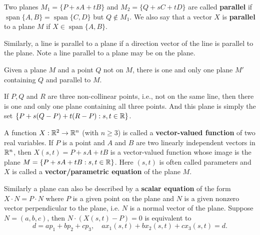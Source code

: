     \begin{definitionenv}
        Two planes $M_1 = \{ P + sA + tB\}$ and $M_2 = \{ Q + sC + tD\}$ are called \textbf{parallel} if $\operatorname{span} \{A,B\} = \operatorname{span} \{C,D\}$ but $Q\notin M_1$. We also say that a vector $X$ is \textbf{parallel} to a plane $M$ if $X\in \operatorname{span} \{A,B\}$.
    \end{definitionenv}
    \begin{remarkenv}
        Similarly, a line is parallel to a plane if a direction vector of the line is parallel to the plane. Note a line parallel to a plane may be on the plane.
    \end{remarkenv}
    \begin{theoremenv}
        Given a plane $M$ and a point $Q$ not on $M$, there is one and only one plane $M'$ containing $Q$ and parallel to $M$.
    \end{theoremenv}
    \begin{theoremenv}
        If $P,Q$ and $R$ are three non-collinear points, i.e., not on the same line, then there is one and only one plane containing all three points. And this plane is simply the set $\{ P + s(Q-P) + t(R-P) : s,t\in \mathbb{R}\}$.
    \end{theoremenv}
    \begin{definitionenv}
        A function $X: \mathbb{R}^2 \to \mathbb{R}^n$ (with $n\ge 3$) is called a \textbf{vector-valued function} of two real variables. If $P$ is a point and $A$ and $B$ are two linearly independent vectors in $\mathbb{R}^n$, then $X(s,t) = P + sA + tB$ is a vector-valued function whose image is the plane $M = \{ P + sA + tB : s,t\in \mathbb{R}\}$. Here $(s,t)$ is often called parameters and $X$ is called a \textbf{vector/parametric equation} of the plane $M$.
    \end{definitionenv}
    \begin{remarkenv}
        Similarly a plane can also be described by a \textbf{scalar equation} of the form $X\cdot N = P\cdot N$ where $P$ is a given point on the plane and $N$ is a given nonzero vector perpendicular to the plane, i.e. $N$ is a normal vector of the plane. Suppose $N=(a,b,c)$, then $N\cdot (X(s,t)-P) = 0$ is equivalent to
        \[
        d = ap_1 + bp_2 + cp_3, \quad ax_1(s,t) + bx_2(s,t) + cx_3(s,t) = d.
        \]
    \end{remarkenv}
